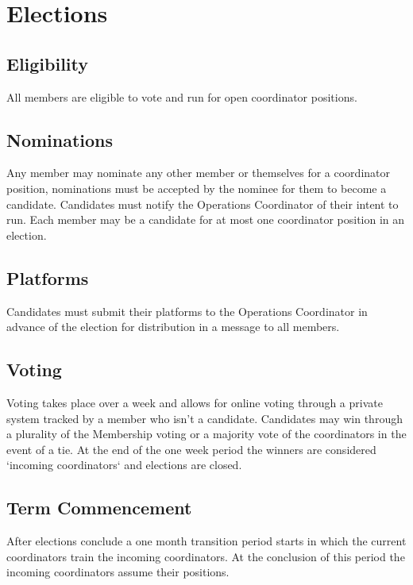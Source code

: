 \chapter{Elections}\label{sec:elections}

\section{Eligibility}\label{sec:eligibility}
All members are eligible to vote and run for open coordinator positions.

\section{Nominations}\label{sec:nominations}
Any member may nominate any other member or themselves for a coordinator position, nominations must be accepted by the nominee for them to become a candidate. Candidates must notify the Operations Coordinator of their intent to run. Each member may be a candidate for at most one coordinator position in an election.

\section{Platforms}\label{sec:platforms}
Candidates must submit their platforms to the Operations Coordinator in advance of the election for distribution in a message to all members.

\section{Voting}\label{sec:voting}
Voting takes place over a week and allows for online voting through a private system tracked by a member who isn't a candidate. Candidates may win through a plurality of the Membership voting or a majority vote of the coordinators in the event of a tie. At the end of the one week period the winners are considered `incoming coordinators` and elections are closed.

\section{Term Commencement}\label{sec:term_commencement}
After elections conclude a one month transition period starts in which the current coordinators train the incoming coordinators. At the conclusion of this period the incoming coordinators assume their positions.
